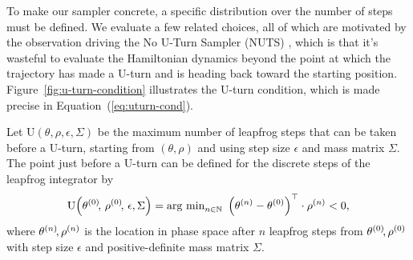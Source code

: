 \documentclass[letterpaper,11pt]{article}
\theoremstyle{plain}%
\theoremstyle{remark}
\begin{document}
To make our sampler concrete, a specific distribution over the number of steps must be defined.  We evaluate a few related choices, all of which are motivated by the observation driving the No U-Turn Sampler (NUTS) \cite{HoGe2014}, which is that it's wasteful to evaluate the Hamiltonian dynamics beyond the point at which the trajectory has made a U-turn and is heading back toward the starting position.  Figure~\ref{fig:u-turn-condition} illustrates the U-turn condition, which is made precise in Equation~(\ref{eq:uturn-cond}).  

Let $\textrm{U}(\theta, \rho, \epsilon, \Sigma)$ be the maximum number of leapfrog steps that can be taken before a U-turn, starting from $(\theta, \rho)$ and using step size $\epsilon$ and mass matrix $\Sigma$.  The point just before a U-turn can be defined for the discrete steps of the leapfrog integrator by
\begin{equation}\label{eq:uturn-cond}
\textrm{U}\!\left(\theta^{(0)}\!,\, \rho^{(0)}\!,\, \epsilon, \Sigma\right)
= \textrm{arg min}_{n \in \mathbb{N}} \ \left(\theta^{(n)} - \theta^{(0)}\right)^\top \cdot \rho^{(n)} < 0,
\end{equation}
where $\theta^{(n)}\!, \rho^{(n)}$ is the location in phase space after $n$ leapfrog steps from $\theta^{(0)}\!, \rho^{(0)}$ with step size $\epsilon$ and positive-definite mass matrix $\Sigma.$  
\end{document}
